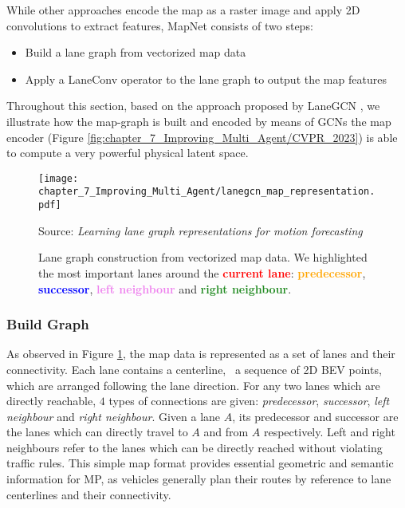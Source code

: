 While other approaches encode the map as a raster image and apply 2D convolutions to extract features, MapNet consists of two steps:

\begin{itemize}
	\item Build a lane graph from vectorized map data
	\item Apply a LaneConv operator to the lane graph to output the map features
\end{itemize}

Throughout this section, based on the approach proposed by LaneGCN \cite{liang2020learning}, we illustrate how the map-graph is built and encoded by means of \acp{GCN} the map encoder (Figure \ref{fig:chapter_7_Improving_Multi_Agent/CVPR_2023}) is able to compute a very powerful physical latent space.

\begin{figure}[h] 
	\centering
	\texttt{[image: chapter\_7\_Improving\_Multi\_Agent/lanegcn\_map\_representation.pdf]}
	\caption[Lane graph construction from vectorized map data]{Lane graph construction from vectorized map data. We highlighted the most important lanes around the \textbf{\textcolor{red}{current lane}}: \textbf{\textcolor{orange}{predecessor}}, \textbf{\textcolor{blue}{successor}}, \textbf{\textcolor{violet}{left neighbour}} and \textbf{\textcolor{ForestGreen}{right neighbour}}.}
	Source: \textit{Learning lane graph representations for motion forecasting} \cite{liang2020learning}
	\label{fig:chapter_7_Improving_Multi_Agent/improving_efficiency_lanegcn_map_representation}
\end{figure}

\subsubsection{Build Graph}
\label{subsec:7_improving_efficiency_build_graph}

As observed in Figure \ref{fig:chapter_7_Improving_Multi_Agent/improving_efficiency_lanegcn_map_representation}, the map data is represented as a set of lanes and their connectivity. Each lane contains a centerline, \ie \ a sequence of 2D \ac{BEV} points, which are arranged following the lane direction. For any two lanes which are directly reachable, $4$ types of connections are given: \textit{predecessor}, \textit{successor}, \textit{left neighbour} and \textit{right neighbour}. Given a lane $A$, its predecessor and successor are the lanes which can directly travel to $A$ and from $A$ respectively. Left and right neighbours refer to the  lanes which can be directly reached without violating traffic rules. This simple map format provides essential geometric and semantic information for \ac{MP}, as vehicles generally plan their routes by reference to lane centerlines and their connectivity. 

